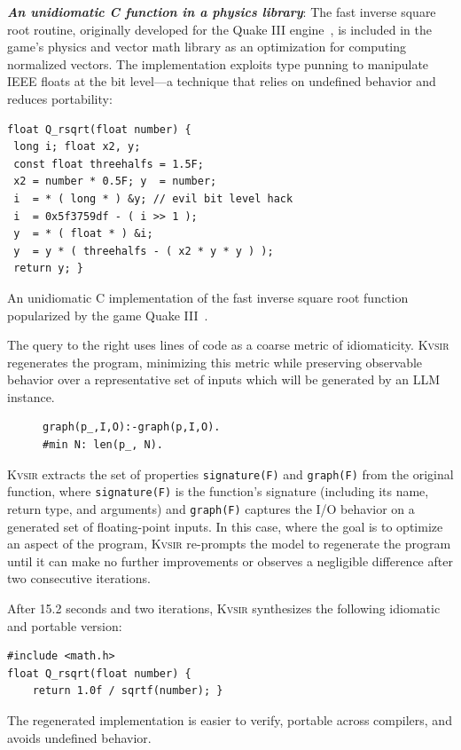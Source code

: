 \documentclass[sigplan,review,anonymous,10pt]{acmart}
\newcommand{\sys}{{\scshape Kv{\textalpha}sir}\xspace}
\newcommand{\heading}[1]{\vspace{2pt}\noindent\textbf{\emph{#1}}:\enspace}
\begin{document}
\heading{An unidiomatic C function in a physics library}
The fast inverse square root routine, originally developed for the Quake III
engine~\cite{fast_inv_sqrt}, is included in the game's physics and vector math
library as an optimization for computing normalized vectors.
The implementation
exploits type punning to manipulate IEEE floats at the bit level—a technique
that relies on undefined behavior and reduces portability:
\begin{listing}
\begin{verbatim}
float Q_rsqrt(float number) {
 long i; float x2, y;
 const float threehalfs = 1.5F;
 x2 = number * 0.5F; y  = number;
 i  = * ( long * ) &y; // evil bit level hack
 i  = 0x5f3759df - ( i >> 1 );
 y  = * ( float * ) &i;
 y  = y * ( threehalfs - ( x2 * y * y ) );
 return y; }
\end{verbatim}
\caption{An unidiomatic C implementation of the fast inverse square root function popularized by the game Quake III~\cite{fast_inv_sqrt}.}
\end{listing}
The query to the right uses lines of code as a coarse metric of
idiomaticity. \sys regenerates the program, minimizing this metric while
preserving observable behavior over a representative set of inputs which will be generated by an LLM instance.
\begin{figure}
\begin{verbatim}
graph(p_,I,O):-graph(p,I,O).
#min N: len(p_, N).
\end{verbatim}
\end{figure}
\sys extracts the set of properties \texttt{signature(F)} and \texttt{graph(F)}
from the original function, where \texttt{signature(F)} is the function's
signature (including its name, return type, and arguments) and
\texttt{graph(F)} captures the I/O behavior on a generated set of
floating-point inputs.
In this case, where the goal is to optimize an aspect of the program, \sys
re-prompts the model to regenerate the program until it can make no further
improvements or observes a negligible difference after two consecutive
iterations.

After 15.2 seconds and two iterations, \sys synthesizes the following idiomatic and portable version:
\begin{verbatim}
#include <math.h>
float Q_rsqrt(float number) {
    return 1.0f / sqrtf(number); }
\end{verbatim}
The regenerated implementation is easier to verify, portable across compilers, and avoids undefined behavior.
\end{document}
